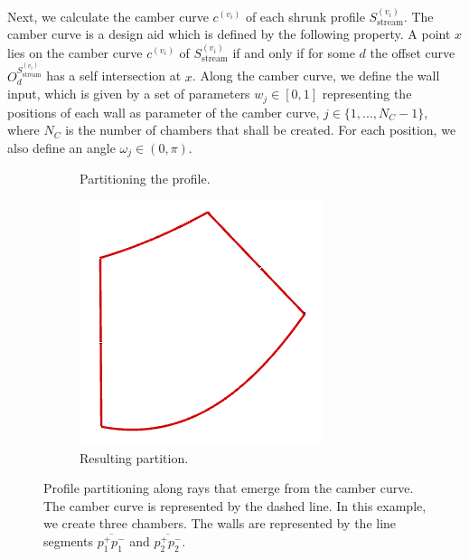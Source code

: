 \documentclass[a4paper, 11pt]{report}
\theoremstyle{definition}
\begin{document}
	Next, we calculate the camber curve $c^{(v_i)}$ of each shrunk profile $S^{(v_i)}_\textrm{stream}$. The camber curve is a design aid which is defined by the following property. A point $x$ lies on the camber curve $c^{(v_i)}$ of $S^{(v_i)}_\textrm{stream}$ if and only if for some $d$ the offset curve $O^{S^{(v_i)}_\textrm{stream}}_d$ has a self intersection at $x$. Along the camber curve, we define the wall input, which is given by a set of parameters $w_j \in [0,1]$ representing the positions of each wall as parameter of the camber curve, $j \in \{1,...,N_C-1\}$, where $N_C$ is the number of chambers that shall be created. For each position, we also define an angle $\omega_j \in (0, \pi)$.

	\begin{figure}[H]
		\centering
		\begin{subfigure}{.5\textwidth}
			
			\caption{Partitioning the profile.}
		\end{subfigure}
		\phantom{aaa}
		\begin{subfigure}{.35\textwidth}
			\includegraphics[width=\textwidth]{../tec/chambers/only_walls.png}
			\vspace{1cm}
			\caption{Resulting partition.}
		\end{subfigure}
		\caption{Profile partitioning along rays that emerge from the camber curve. The camber curve is represented by the dashed line. In this example, we create three chambers. The walls are represented by the line segments $\overline{p_1^+p_1^-}$ and $\overline{p_2^+p_2^-}$.}
		\label{fig:subdivision_chamber}
	\end{figure}
\end{document}
